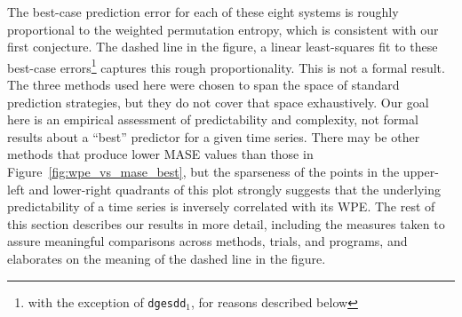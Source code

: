 The best-case prediction error for each of these eight systems is
roughly proportional to the weighted permutation entropy, which is
consistent with our first conjecture.  The dashed line in the figure,
a linear least-squares fit to these best-case errors\footnote{with the
  exception of {\tt dgesdd$_1$}, for reasons described below} captures
this rough proportionality.  This is not a formal result.  The three
methods used here were chosen to span the space of standard prediction
strategies, but they do not cover that space exhaustively.  Our goal
here is an empirical assessment of predictability and complexity, not
formal results about a ``best'' predictor for a given time series.
There may be other methods that produce lower MASE values than those
in Figure~\ref{fig:wpe_vs_mase_best}, but the sparseness of the points
in the upper-left and lower-right quadrants of this plot strongly
suggests that the underlying predictability of a time series is
inversely correlated with its WPE.  The rest of this section describes
our results in more detail, including the measures taken to assure
meaningful comparisons across methods, trials, and programs, and
elaborates on the meaning of the dashed line in the figure.

